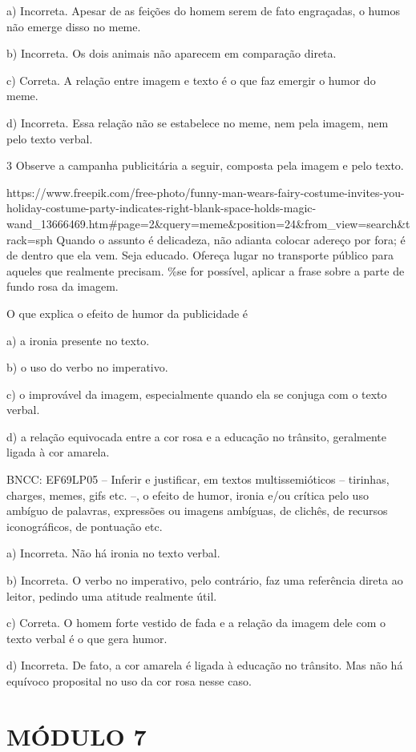 a) Incorreta. Apesar de as feições do homem serem de fato engraçadas, o
humos não emerge disso no meme.

b) Incorreta. Os dois animais não aparecem em comparação direta.

c) Correta. A relação entre imagem e texto é o que faz emergir o humor
do meme.

d) Incorreta. Essa relação não se estabelece no meme, nem pela imagem,
nem pelo texto verbal.

\num{3} Observe a campanha publicitária a seguir, composta pela imagem e
pelo texto.

https://www.freepik.com/free-photo/funny-man-wears-fairy-costume-invites-you-holiday-costume-party-indicates-right-blank-space-holds-magic-wand\_13666469.htm\#page=2\&query=meme\&position=24\&from\_view=search\&track=sph
Quando o assunto é delicadeza, não adianta colocar adereço por fora; é
de dentro que ela vem. Seja educado. Ofereça lugar no transporte público
para aqueles que realmente precisam. \%se for possível, aplicar a frase
sobre a parte de fundo rosa da imagem.

O que explica o efeito de humor da publicidade é

a) a ironia presente no texto.

b) o uso do verbo no imperativo.

c) o improvável da imagem, especialmente quando ela se conjuga com o
texto verbal.

d) a relação equivocada entre a cor rosa e a educação no trânsito,
geralmente ligada à cor amarela.

BNCC: EF69LP05 -- Inferir e justificar, em textos multissemióticos --
tirinhas, charges, memes, gifs etc. --, o efeito de humor, ironia e/ou
crítica pelo uso ambíguo de palavras, expressões ou imagens ambíguas, de
clichês, de recursos iconográficos, de pontuação etc.

a) Incorreta. Não há ironia no texto verbal.

b) Incorreta. O verbo no imperativo, pelo contrário, faz uma referência
direta ao leitor, pedindo uma atitude realmente útil.

c) Correta. O homem forte vestido de fada e a relação da imagem dele com
o texto verbal é o que gera humor.

d) Incorreta. De fato, a cor amarela é ligada à educação no trânsito.
Mas não há equívoco proposital no uso da cor rosa nesse caso.

\hypertarget{muxf3dulo-7}{%
\section{MÓDULO 7}\label{muxf3dulo-7}}

